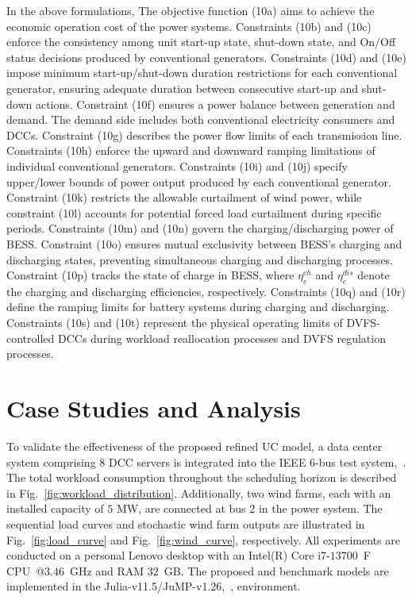 \documentclass[lettersize,journal]{IEEEtran}
\begin{document}
In the above formulations,
The objective function (10a) aims to achieve the economic operation cost of the power systems.
Constraints (10b) and (10c) enforce the consistency among unit start-up state, shut-down state, and On/Off status decisions produced by conventional generators.
Constraints (10d) and (10e) impose minimum start-up/shut-down duration restrictions for each conventional generator, ensuring adequate duration between consecutive start-up and shut-down actions.
Constraint (10f) ensures a power balance between generation and demand. The demand side includes both conventional electricity consumers and DCCs.
Constraint (10g) describes the power flow limits of each transmission line.
Constraints (10h) enforce the upward and downward ramping limitations of individual conventional generators.
Constraints (10i) and (10j) specify upper/lower bounds of power output produced by each conventional generator.
Constraint (10k) restricts the allowable curtailment of wind power, while constraint (10l) accounts for potential forced load curtailment during specific periods.
Constraints (10m) and (10n) govern the charging/discharging power of BESS.
Constraint (10o) ensures mutual exclusivity between BESS's charging and discharging states, preventing simultaneous charging and discharging processes.
Constraint (10p) tracks the state of charge in BESS, where $\eta_{e}^{ch}$ and $\eta_{e}^{dis}$ denote the charging and discharging efficiencies, respectively.
Constraints (10q) and (10r) define the ramping limits for battery systems during charging and discharging.
Constraints (10s) and (10t) represent the physical operating limits of DVFS-controlled DCCs during workload reallocation processes and DVFS regulation processes.


\section{Case Studies and Analysis}

To validate the effectiveness of the proposed refined UC model, a data center system comprising $8$ DCC servers is integrated into the IEEE 6-bus test system,~\cite{zhang2017chance}. The total workload consumption throughout the scheduling horizon is described in Fig.~\ref{fig:workload_distribution}. Additionally, two wind farms, each with an installed capacity of $5$ MW, are connected at bus 2 in the power system. The sequential load curves and stochastic wind farm outputs are illustrated in Fig.~\ref{fig:load_curve} and Fig.~\ref{fig:wind_curve}, respectively. All experiments are conducted on a personal Lenovo desktop with an Intel(R) Core i7-$13700$~F CPU~@$3.46$~GHz and RAM $32$~GB. The proposed and benchmark models are implemented in the Julia-v11.5/JuMP-v1.26,~\cite{Lubin2023}, environment.
\end{document}
